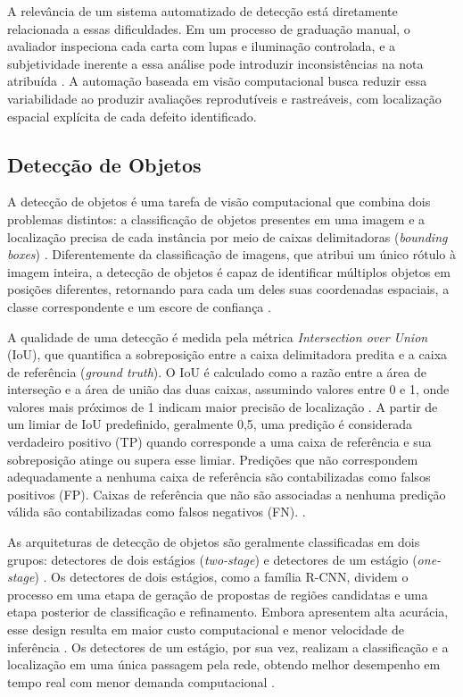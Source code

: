 \documentclass[
    12pt,                %
    openright,           %
    oneside,             %
    a4paper,             %
    english,             %
    brazil               %
]{abntex2}
\begin{document}
A relevância de um sistema automatizado de detecção está diretamente 
relacionada a essas dificuldades. Em um processo de graduação manual, 
o avaliador inspeciona cada carta com lupas e iluminação controlada, e 
a subjetividade inerente a essa análise pode introduzir inconsistências 
na nota atribuída \cite{Nahar2025}. A automação baseada em visão 
computacional busca reduzir essa variabilidade ao produzir avaliações 
reprodutíveis e rastreáveis, com localização espacial explícita de cada 
defeito identificado.

\subsection{Detecção de Objetos}
\label{subsec:deteccao_objetos}

A detecção de objetos é uma tarefa de visão computacional que combina 
dois problemas distintos: a classificação de objetos presentes em uma 
imagem e a localização precisa de cada instância por meio de caixas 
delimitadoras (\textit{bounding boxes}) \cite{Hussain2023}. Diferentemente 
da classificação de imagens, que atribui um único rótulo à imagem 
inteira, a detecção de objetos é capaz de identificar múltiplos 
objetos em posições diferentes, retornando para cada um deles 
suas coordenadas espaciais, a classe correspondente e um escore 
de confiança \cite{Ramos2025}.

A qualidade de uma detecção é medida pela métrica 
\textit{Intersection over Union} (IoU), que quantifica a sobreposição 
entre a caixa delimitadora predita e a caixa de referência 
(\textit{ground truth}). O IoU é calculado como a razão entre a 
área de interseção e a área de união das duas caixas, assumindo 
valores entre 0 e 1, onde valores mais próximos de 1 indicam 
maior precisão de localização \cite{Ramos2025}. A partir de um limiar 
de IoU predefinido, geralmente 0,5, uma predição é considerada
verdadeiro positivo (TP) quando corresponde a uma caixa de 
referência e sua sobreposição atinge ou supera esse limiar. 
Predições que não correspondem adequadamente a nenhuma caixa
de referência são contabilizadas como falsos positivos (FP). 
Caixas de referência que não são associadas 
a nenhuma predição válida são contabilizadas como falsos negativos (FN).
\cite{Ramos2025}.

As arquiteturas de detecção de objetos são geralmente 
classificadas em dois grupos: detectores de dois estágios 
(\textit{two-stage}) e detectores de um estágio 
(\textit{one-stage}) \cite{Hussain2023}. Os detectores de dois 
estágios, como a família R-CNN, dividem o processo em uma etapa 
de geração de propostas de regiões candidatas e uma etapa 
posterior de classificação e refinamento. Embora apresentem alta 
acurácia, esse design resulta em maior custo computacional e 
menor velocidade de inferência \cite{Situ2023}. Os detectores 
de um estágio, por sua vez, realizam a classificação e a 
localização em uma única passagem pela rede, obtendo melhor 
desempenho em tempo real com menor demanda computacional 
\cite{Hussain2023}.
\end{document}
